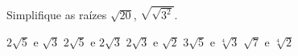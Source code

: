 Simplifique as raízes $\sqrt{20}$, $\sqrt{\sqrt{3^2}}$.

$2\sqrt{5}$ e $\sqrt{3}$
$2\sqrt{5}$ e $2\sqrt{3}$
$2\sqrt{3}$ e $\sqrt{2}$
$3\sqrt{5}$ e $\sqrt[4]{3}$
$\sqrt{7}$ e $\sqrt[4]{2}$


